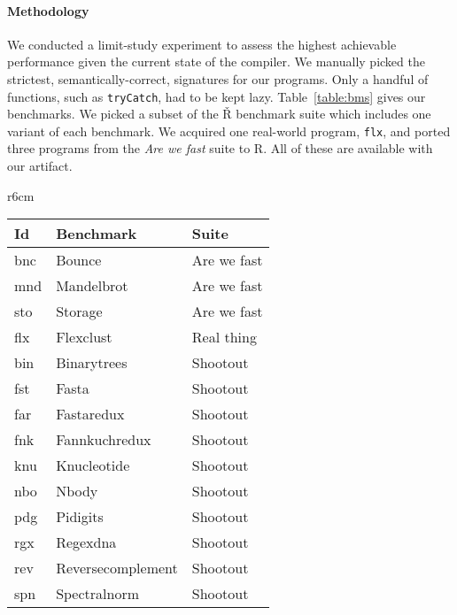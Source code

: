\documentclass[review,creen,acmsmall]{acmart}
\renewcommand{\c}[1]{\lstinline |#1|\xspace}
\renewcommand{\Rsh}{{\sf\v R}\xspace}
\begin{document}
\paragraph{Methodology}
We conducted a limit-study experiment to assess the highest achievable
performance given the current state of the compiler. We manually picked the
strictest, semantically-correct, signatures for our programs. Only a handful of
functions, such as \lstinline{tryCatch}, had to be kept lazy.
Table~\ref{table:bms} gives our benchmarks. We picked a subset of the \Rsh
benchmark suite which includes one variant of each benchmark. We acquired one
real-world program, \c{flx}, and ported three programs from the \emph{Are we
fast} suite to R. All of these are available with our artifact.

\begin{wrapfigure}{r}{6cm}
  \small
  \caption{Benchmarks}\label{table:bms}
  \begin{tabular}{lll}
    \toprule
    \bf Id&\bf Benchmark&\bf Suite\\
    \midrule
    bnc&Bounce&Are we fast\\
    mnd&Mandelbrot&Are we fast\\
    sto&Storage&Are we fast\\
    flx&Flexclust&Real thing\\
    bin&Binarytrees&Shootout\\
    fst&Fasta&Shootout\\
    far&Fastaredux&Shootout\\
    fnk&Fannkuchredux&Shootout\\
    knu&Knucleotide&Shootout\\
    nbo&Nbody&Shootout\\
    pdg&Pidigits&Shootout\\
    rgx&Regexdna&Shootout\\
    rev&Reversecomplement&Shootout\\
    spn&Spectralnorm&Shootout\\
    \bottomrule
  \end{tabular}
\end{wrapfigure}
\end{document}
